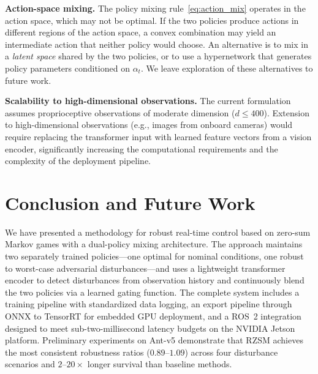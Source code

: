\documentclass[conference]{IEEEtran}
\begin{document}
\textbf{Action-space mixing.}  The policy mixing rule~\eqref{eq:action_mix}
operates in the action space, which may not be optimal.  If the two
policies produce actions in different regions of the action space, a
convex combination may yield an intermediate action that neither policy
would choose.  An alternative is to mix in a \emph{latent space} shared
by the two policies, or to use a hypernetwork that generates policy
parameters conditioned on $\alpha_t$.  We leave exploration of these
alternatives to future work.

\textbf{Scalability to high-dimensional observations.}  The current
formulation assumes proprioceptive observations of moderate dimension
($d \leq 400$).  Extension to high-dimensional observations (e.g.,
images from onboard cameras) would require replacing the transformer
input with learned feature vectors from a vision encoder, significantly
increasing the computational requirements and the complexity of the
deployment pipeline.

\section{Conclusion and Future Work}\label{sec:conclusion}

We have presented a methodology for robust real-time control based on
zero-sum Markov games with a dual-policy mixing architecture.  The
approach maintains two separately trained policies---one optimal for
nominal conditions, one robust to worst-case adversarial
disturbances---and uses a lightweight transformer encoder to detect
disturbances from observation history and continuously blend the two
policies via a learned gating function.  The complete system includes
a training pipeline with standardized data logging, an export pipeline
through ONNX to TensorRT for embedded GPU deployment, and a ROS~2
integration designed to meet sub-two-millisecond latency budgets on the
NVIDIA Jetson platform.  Preliminary experiments on Ant-v5 demonstrate
that RZSM achieves the most consistent robustness ratios
($0.89$--$1.09$) across four disturbance scenarios and $2$--$20\times$
longer survival than baseline methods.
\end{document}
